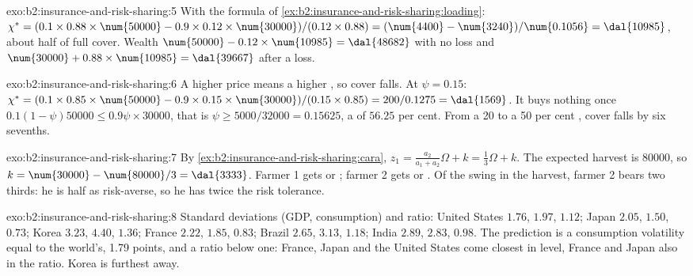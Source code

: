 \begin{solution}{exo:b2:insurance-and-risk-sharing:5}
With the formula of \cref{ex:b2:insurance-and-risk-sharing:loading}: $\chi^{*} = (0.1 \times 0.88
\times \num{50000} - 0.9 \times 0.12 \times \num{30000})/(0.12 \times 0.88) = (\num{4400} -
\num{3240})/\num{0.1056} = \dal{10985}$, about half of full cover. Wealth $\num{50000} - 0.12 \times
\num{10985} = \dal{48682}$ with no loss and $\num{30000} + 0.88 \times \num{10985} = \dal{39667}$ after
a loss.
\end{solution}

\begin{solution}{exo:b2:insurance-and-risk-sharing:6}
A higher price means a higher , so cover falls. At $\psi = 0.15$: $\chi^{*} = (0.1 \times 0.85
\times \num{50000} - 0.9 \times 0.15 \times \num{30000})/(0.15 \times 0.85) = 200/0.1275 =
\dal{1569}$. It buys nothing once $0.1(1 - \psi)\num{50000} \le 0.9\psi \times \num{30000}$, that is
$\psi \ge \num{5000}/\num{32000} = 0.15625$, a  of $56.25$ per cent. From a 20 to a 50 per cent
, cover falls by six sevenths.
\end{solution}

\begin{solution}{exo:b2:insurance-and-risk-sharing:7}
By \cref{ex:b2:insurance-and-risk-sharing:cara}, $z_1 = \tfrac{a_2}{a_1 + a_2}\Omega + k =
\tfrac13\Omega + k$. The expected harvest is \num{80000}, so $k = \num{30000} - \num{80000}/3 =
\dal{3333}$. Farmer 1 gets  or ; farmer 2 gets  or . Of the
 swing in the harvest, farmer 2 bears two thirds: he is half as risk-averse, so he has twice
the risk tolerance.
\end{solution}

\begin{solution}{exo:b2:insurance-and-risk-sharing:8}
Standard deviations (GDP, consumption) and ratio: United States $1.76$, $1.97$, $1.12$; Japan $2.05$,
$1.50$, $0.73$; Korea $3.23$, $4.40$, $1.36$; France $2.22$, $1.85$, $0.83$; Brazil $2.65$, $3.13$,
$1.18$; India $2.89$, $2.83$, $0.98$. The prediction is a consumption volatility equal to the world's,
1.79 points, and a ratio below one: France, Japan and the United States come closest in level, France
and Japan also in the ratio. Korea is furthest away.
\end{solution}

